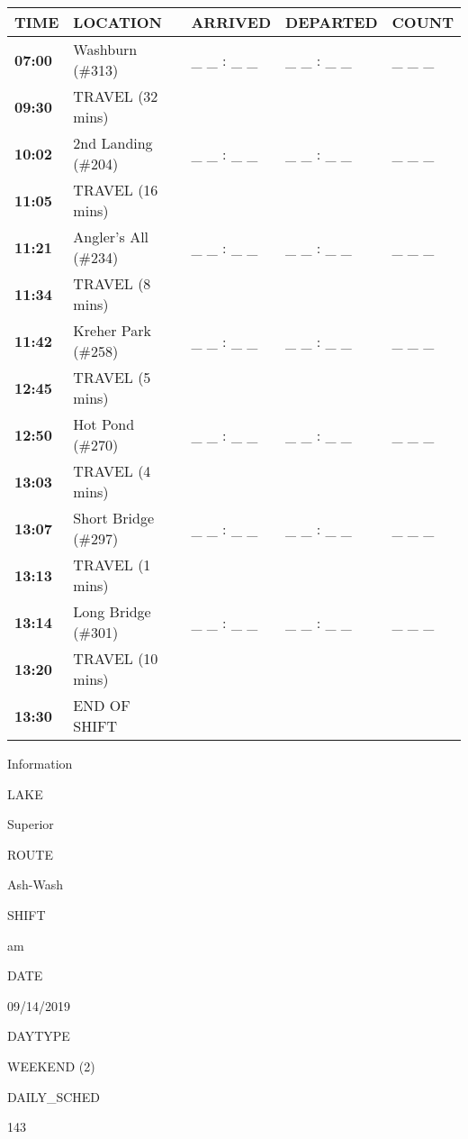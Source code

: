 \documentclass[]{article}
\begin{document}
\begin{tabular}{>{\bfseries}lllll}
\toprule
\textbf{TIME} & \textbf{LOCATION} & \textbf{ARRIVED} & \textbf{DEPARTED} & \textbf{COUNT}\\
\midrule
07:00 & Washburn (\#313) & \_ \_ : \_ \_ & \_ \_ : \_ \_ & \_ \_ \_\\
09:30 & TRAVEL (32 mins) &  &  & \\
10:02 & 2nd Landing (\#204) & \_ \_ : \_ \_ & \_ \_ : \_ \_ & \_ \_ \_\\
11:05 & TRAVEL (16 mins) &  &  & \\
11:21 & Angler's All (\#234) & \_ \_ : \_ \_ & \_ \_ : \_ \_ & \_ \_ \_\\
11:34 & TRAVEL (8 mins) &  &  & \\
11:42 & Kreher Park (\#258) & \_ \_ : \_ \_ & \_ \_ : \_ \_ & \_ \_ \_\\
12:45 & TRAVEL (5 mins) &  &  & \\
12:50 & Hot Pond (\#270) & \_ \_ : \_ \_ & \_ \_ : \_ \_ & \_ \_ \_\\
13:03 & TRAVEL (4 mins) &  &  & \\
13:07 & Short Bridge (\#297) & \_ \_ : \_ \_ & \_ \_ : \_ \_ & \_ \_ \_\\
13:13 & TRAVEL (1 mins) &  &  & \\
13:14 & Long Bridge (\#301) & \_ \_ : \_ \_ & \_ \_ : \_ \_ & \_ \_ \_\\
13:20 & TRAVEL (10 mins) &  &  & \\
13:30 & END OF SHIFT &  &  & \\
\bottomrule
\end{tabular}\newpage

Information

LAKE

Superior

ROUTE

Ash-Wash

SHIFT

am

DATE

09/14/2019

DAYTYPE

WEEKEND (2)

DAILY\_SCHED

143

\vspace{24pt}
\end{document}
